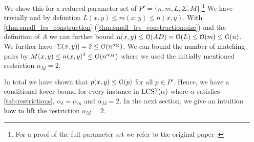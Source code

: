 We show this for a reduced parameter set of $P' = \{n, m, L, \Sigma, M\}$.\footnote{For a proof of the full parameter set we refer to the original paper \cite[section 9.1.2]{Bringman.2018}.} %
We have trivially and by definition $L(x,y) \leq m(x,y) \leq n(x,y)$.
With \autoref{thm:small_lcs_construction} (\ref{thm:small_lcs_construction:size}) and the definition of $A$ we can further bound $n(x,y) \leq \mathcal{O}(AD) = \mathcal{O}(L) \leq \mathcal{O}(m) \leq \mathcal{O}(n)$. %
We further have $|\Sigma(x,y)| = 2 \leq \mathcal{O}(n^{\alpha_\Sigma})$.
We can bound the number of matching pairs by $M(x,y) \leq n(x,y)^2 \leq \mathcal{O}(n^{\alpha_M})$ where we used the initially mentioned restriction $\alpha_M = 2$.

In total we have shown that $p(x,y) \leq \mathcal{O}(p)$ for all $p \in P'$.
Hence, we have a conditional lower bound for every instance in $\text{LCS}^\gamma(\mathbb{\alpha})$ where $\mathbb{\alpha}$ satisfies \autoref{tab:restrictions}, $\alpha_\delta = \alpha_m$ and $\alpha_M = 2$.
In the next section, we give an intuition how to lift the restriction $\alpha_M = 2$.


